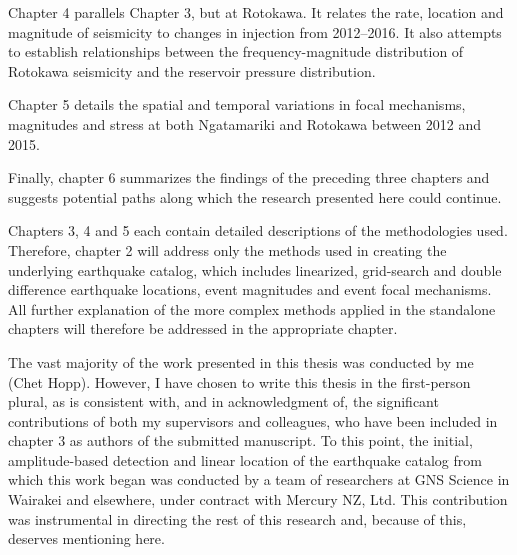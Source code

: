 Chapter 4 parallels Chapter 3, but at Rotokawa. It relates the rate, location and magnitude of seismicity to changes in injection from 2012--2016. It also attempts to establish relationships between the frequency-magnitude distribution of Rotokawa seismicity and the reservoir pressure distribution.

Chapter 5 details the spatial and temporal variations in focal mechanisms, magnitudes and stress at both Ngatamariki and Rotokawa between 2012 and 2015.

Finally, chapter 6 summarizes the findings of the preceding three chapters and suggests potential paths along which the research presented here could continue.

Chapters 3, 4 and 5 each contain detailed descriptions of the methodologies used. Therefore, chapter 2 will address only the methods used in creating the underlying earthquake catalog, which includes linearized, grid-search and double difference earthquake locations, event magnitudes and event focal mechanisms. All further explanation of the more complex methods applied in the standalone chapters will therefore be addressed in the appropriate chapter.

The vast majority of the work presented in this thesis was conducted by me (Chet Hopp). However, I have chosen to write this thesis in the first-person plural, as is consistent with, and in acknowledgment of, the significant contributions of both my supervisors and colleagues, who have been included in chapter 3 as authors of the submitted manuscript. To this point, the initial, amplitude-based detection and linear location of the earthquake catalog from which this work began was conducted by a team of researchers at GNS Science in Wairakei and elsewhere, under contract with Mercury NZ, Ltd. This contribution was instrumental in directing the rest of this research and, because of this, deserves mentioning here.